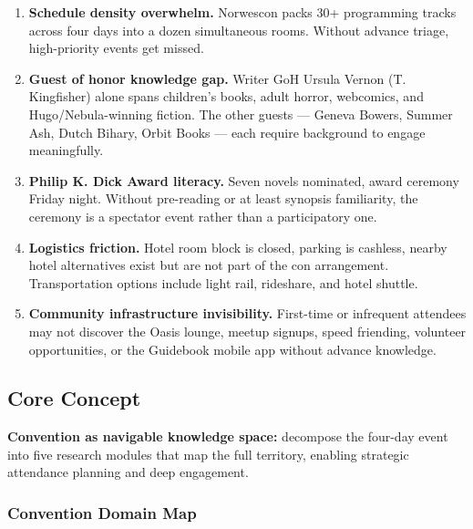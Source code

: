 \documentclass[11pt,letterpaper]{article}
\begin{document}
\begin{enumerate}[leftmargin=2em]
\item \textbf{Schedule density overwhelm.} Norwescon packs 30+ programming tracks across four days into a dozen simultaneous rooms. Without advance triage, high-priority events get missed.
\item \textbf{Guest of honor knowledge gap.} Writer GoH Ursula Vernon (T. Kingfisher) alone spans children's books, adult horror, webcomics, and Hugo/Nebula-winning fiction. The other guests --- Geneva Bowers, Summer Ash, Dutch Bihary, Orbit Books --- each require background to engage meaningfully.
\item \textbf{Philip K. Dick Award literacy.} Seven novels nominated, award ceremony Friday night. Without pre-reading or at least synopsis familiarity, the ceremony is a spectator event rather than a participatory one.
\item \textbf{Logistics friction.} Hotel room block is closed, parking is cashless, nearby hotel alternatives exist but are not part of the con arrangement. Transportation options include light rail, rideshare, and hotel shuttle.
\item \textbf{Community infrastructure invisibility.} First-time or infrequent attendees may not discover the Oasis lounge, meetup signups, speed friending, volunteer opportunities, or the Guidebook mobile app without advance knowledge.
\end{enumerate}

\subsection{Core Concept}

\textbf{Convention as navigable knowledge space:} decompose the four-day event into five research modules that map the full territory, enabling strategic attendance planning and deep engagement.

\subsubsection{Convention Domain Map}
\end{document}
